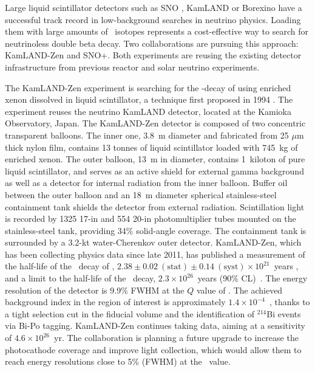 %
Large liquid scintillator detectors such as SNO \cite{SNO:2002tuh}, KamLAND \cite{KamLAND:2002uet} or Borexino \cite{Borexino:2008gab} have a successful track record in low-background searches in neutrino physics. Loading them with large amounts of \bb\ isotopes represents a cost-effective way to search for neutrinoless double beta decay. Two collaborations are pursuing this approach: KamLAND-Zen and SNO+. Both experiments are reusing the existing detector infrastructure from previous reactor and solar neutrino experiments. 

The KamLAND-Zen experiment is searching for the \bbonu-decay of  using enriched xenon dissolved in liquid scintillator, a technique first proposed in 1994 \cite{Raghavan:1994qw}. The experiment reuses the neutrino KamLAND detector, located at the Kamioka Observatory, Japan. The KamLAND-Zen detector is composed of two concentric transparent balloons. The inner one, 3.8~m diameter and fabricated from 25 $\mu$m thick nylon film, contains 13 tonnes of liquid scintillator loaded with 745~kg of enriched xenon. The outer balloon, 13~m in diameter, contains 1~kiloton of pure liquid scintillator, and serves as an active shield for external gamma background as well as a detector for internal radiation from the inner balloon. Buffer oil between the outer balloon and an 18~m diameter spherical stainless-steel containment tank shields the detector from external radiation. Scintillation light is recorded by 1325 17-in and 554 20-in photomultiplier tubes mounted on the stainless-steel tank, providing 34\% solid-angle coverage. The containment tank is surrounded by a 3.2-kt water-Cherenkov outer detector. KamLAND-Zen, which has been collecting physics data since late 2011, has published a measurement of the half-life of the \bbtnu\ decay of , $2.38\pm0.02~(\mathrm{stat})\pm0.14~(\mathrm{syst})\times10^{21}$~years \cite{KamLAND-Zen:2012vpv}, and a limit to the half-life of the \bbonu\ decay, $2.3\times10^{26}$~years (90\% CL)~\cite{KamLAND-Zen:2022tow}. The energy resolution of the detector is 9.9\% FWHM at the $Q$ value of . The achieved background index in the region of interest is approximately $1.4\times10^{-4}$~\ckky, thanks to a tight selection cut in the fiducial volume and the identification of $^{214}$Bi events via Bi-Po tagging. KamLAND-Zen continues taking data, aiming at a sensitivity of $4.6\times10^{26}$~yr. The collaboration is planning a future upgrade to increase the photocathode coverage and improve light collection, which would allow them to reach energy resolutions close to 5\% (FWHM) at the \Qbb\ value. 

